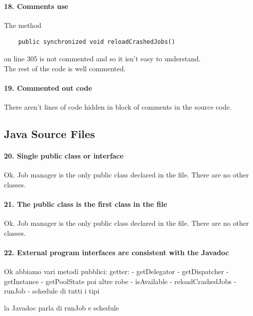 \documentclass[english]{article}
\begin{document}
\paragraph{18. Comments use}
The method 
\begin{lstlisting} 
	public synchronized void reloadCrashedJobs() 
\end{lstlisting}
 on line 305 is not commented and so it isn't easy to understand. \\
The rest of the code is well commented.

\paragraph{19. Commented out code}
There aren't lines of code hidden in block of comments in the source code.

\subsection{Java Source Files}
\paragraph{20. Single public class or interface}
Ok.
Job manager is the only public class declared in the file.
There are no other classes.

\paragraph{21. The public class is the first class in the file}
Ok.
Job manager is the only public class declared in the file.
There are no other classes.

\paragraph{22. External program interfaces are consistent with the Javadoc}
Ok
abbiamo vari metodi pubblici:
getter:
- getDelegator
- getDispatcher
- getInstance
- getPoolState
poi altre robe
- isAvailable
- reloadCrashedJobs
- runJob
- schedule di tutti i tipi

la Javadoc parla di runJob e schedule
\end{document}
